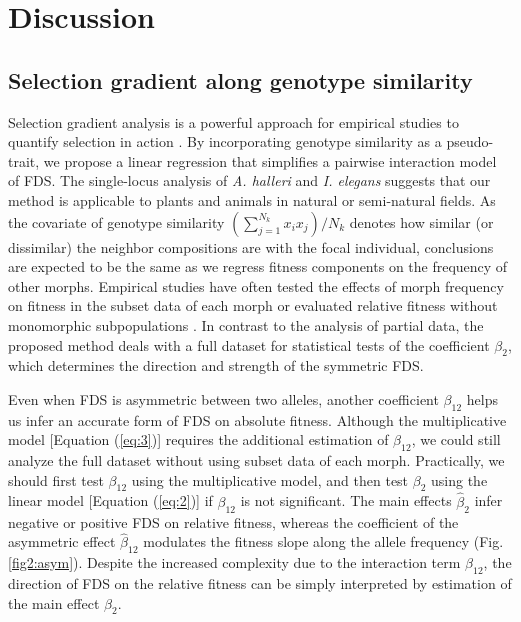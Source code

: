 \documentclass[12pt,]{article}
\begin{document}
\section{Discussion}

\subsection{Selection gradient along genotype similarity}
Selection gradient analysis is a powerful approach for empirical studies to quantify selection in action \citep{lande1983measurement, mitchell1987regression, chong2018note}. By incorporating genotype similarity as a pseudo-trait, we propose a linear regression that simplifies a pairwise interaction model of FDS. The single-locus analysis of \textit{A. halleri} and \textit{I. elegans} suggests that our method is applicable to plants and animals in natural or semi-natural fields. As the covariate of genotype similarity $(\sum^{N_k}_{j=1}x_i x_j)/N_k$ denotes how similar (or dissimilar) the neighbor compositions are with the focal individual, conclusions are expected to be the same as we regress fitness components on the frequency of other morphs. Empirical studies have often tested the effects of morph frequency on fitness in the subset data of each morph \citep{mccauley1998frequency, bennington1998field, sato2017herbivore} or evaluated relative fitness without monomorphic subpopulations \citep{gigord2001negative, takahashi2010negative}. In contrast to the analysis of partial data, the proposed method deals with a full dataset for statistical tests of the coefficient $\beta_2$, which determines the direction and strength of the symmetric FDS.

Even when FDS is asymmetric between two alleles, another coefficient $\beta_{12}$ helps us infer an accurate form of FDS on absolute fitness. Although the multiplicative model [Equation (\ref{eq:3})] requires the additional estimation of $\beta_{12}$, we could still analyze the full dataset without using subset data of each morph. Practically, we should first test $\beta_{12}$ using the multiplicative model, and then test $\beta_2$ using the linear model [Equation (\ref{eq:2})] if $\beta_{12}$ is not significant. The main effects $\hat{\beta}_{2}$ infer negative or positive FDS on relative fitness, whereas the coefficient of the asymmetric effect $\hat{\beta}_{12}$ modulates the fitness slope along the allele frequency (Fig. \ref{fig2:asym}). Despite the increased complexity due to the interaction term $\beta_{12}$, the direction of FDS on the relative fitness can be simply interpreted by estimation of the main effect $\beta_2$.
\end{document}
